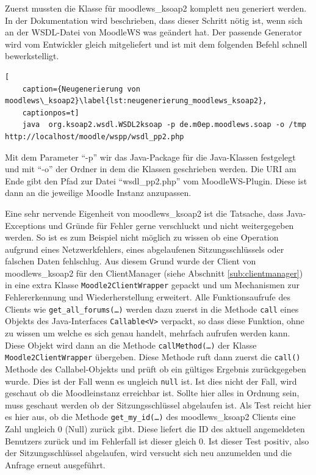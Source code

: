 Zuerst mussten die Klasse für moodlews\_ksoap2 komplett neu generiert werden. In der Dokumentation wird beschrieben, dass dieser Schritt nötig ist, wenn sich an der WSDL-Datei von MoodleWS was geändert hat. Der passende Generator wird vom Entwickler gleich mitgeliefert und ist mit dem folgenden Befehl schnell bewerkstelligt.

\begin{lstlisting}[
    caption={Neugenerierung von moodlews\_ksoap2}\label{lst:neugenerierung_moodlews_ksoap2},
    captionpos=t]
    java  org.ksoap2.wsdl.WSDL2ksoap -p de.m0ep.moodlews.soap -o /tmp http://localhost/moodle/wspp/wsdl_pp2.php
\end{lstlisting}

Mit dem Parameter \enquote{-p} wir das Java-Package für die Java-Klassen festgelegt und mit \enquote{-o} der Ordner in dem die Klassen geschrieben werden. Die URI am Ende gibt den Pfad zur Datei \enquote{wsdl\_pp2.php} vom MoodleWS-Plugin. Diese ist dann an die jeweilige Moodle Instanz anzupassen.

Eine sehr nervende Eigenheit von moodlews\_ksoap2 ist die Tatsache, dass Java-Exceptions und Gründe für Fehler gerne verschluckt und nicht weitergegeben werden. So ist es zum Beispiel nicht möglich zu wissen ob eine Operation aufgrund eines Netzwerkfehlers, eines abgelaufenen Sitzungsschlüssels oder falschen Daten fehlschlug. Aus diesem Grund wurde der Client von moodlews\_ksoap2 für den ClientManager (siehe Abschnitt \ref{sub:clientmanager}) in eine extra Klasse \texttt{Moodle2ClientWrapper} gepackt und um Mechanismen zur Fehlererkennung und Wiederherstellung erweitert. Alle Funktionsaufrufe des Clients wie \texttt{get\_all\_forums(\dots)} werden dazu zuerst in die Methode \texttt{call} eines Objekts des Java-Interfaces \texttt{Callable<V>} verpackt, so dass diese Funktion, ohne zu wissen um welche es sich genau handelt, mehrfach aufrufen werden kann. Diese Objekt wird dann an die Methode \texttt{callMethod(\dots)} der Klasse \texttt{Moodle2ClientWrapper} übergeben. Diese Methode ruft dann zuerst die \texttt{call()} Methode des Callabel-Objekts und prüft ob ein gültiges Ergebnis zurückgegeben wurde. Dies ist der Fall wenn es ungleich \texttt{null} ist. Ist dies nicht der Fall, wird geschaut ob die Moodleinstanz erreichbar ist. Sollte hier alles in Ordnung sein, muss geschaut werden ob der Sitzungsschlüssel abgelaufen ist. Als Test reicht hier es hier aus, ob die Methode \texttt{get\_my\_id(\dots)} des moodlews\_ksoap2 Clients eine Zahl ungleich 0 (Null) zurück gibt. Diese liefert die ID des aktuell angemeldeten Benutzers zurück und im Fehlerfall ist dieser gleich 0. Ist dieser Test positiv, also der Sitzungsschlüssel abgelaufen, wird versucht sich neu anzumelden und die Anfrage erneut ausgeführt.

